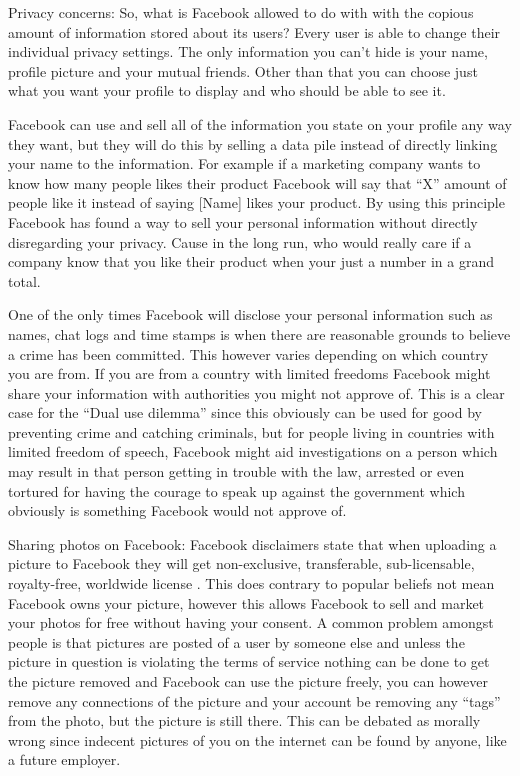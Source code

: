 \documentclass[conference]{IEEEtran}
\begin{document}
Privacy concerns: 
So, what is Facebook allowed to do with with the copious amount of information stored about its users?
Every user is able to change their individual privacy settings. The only information you can’t hide is your name, profile picture and your mutual friends. Other than that you can choose just what you want your profile to display and who should be able to see it\cite{JacobClifton2011}. 

Facebook can use and sell all of the information you state on your profile any way they want, but they will do this by selling a data pile instead of directly linking your name to the information\cite{JacobClifton2011}. For example if a marketing company wants to know how many people likes their product Facebook will say that “X” amount of people like it instead of saying [Name] likes your product. By using this principle Facebook has found a way to sell your personal information without directly disregarding your privacy. Cause in the long run, who would really care if a company know that you like their product when your just a number in a grand total.

One of the only times Facebook will disclose your personal information such as names, chat logs and time stamps is when there are reasonable grounds to believe a crime has been committed. This however varies depending on which country you are from. If you are from a country with limited freedoms Facebook might share your information with authorities you might not approve of. This is a clear case for the “Dual use dilemma” since this obviously can be used for good by preventing crime and catching criminals, but for people living in countries with limited freedom of speech, Facebook might aid investigations \cite{JacobClifton2011} on a person which may result in that person getting in trouble with the law, arrested or even tortured for having the courage to speak up against the government which obviously is something Facebook would not approve of.

Sharing photos on Facebook:
Facebook disclaimers state that when uploading a picture to Facebook they will get non-exclusive, transferable, sub-licensable, royalty-free, worldwide license \cite{LawOfficeDelsack}. This does contrary to popular beliefs not mean Facebook owns your picture, however this allows Facebook to sell and market your photos for free without having your consent. A common problem amongst people is that pictures are posted of a user by someone else and unless the picture in question is violating the terms of service nothing can be done to get the picture removed and Facebook can use the picture freely, you can however remove any connections of the picture and your account be removing any “tags” from the photo, but the picture is still there. This can be debated as morally wrong since indecent pictures of you on the internet can be found by anyone, like a future employer.
\end{document}
